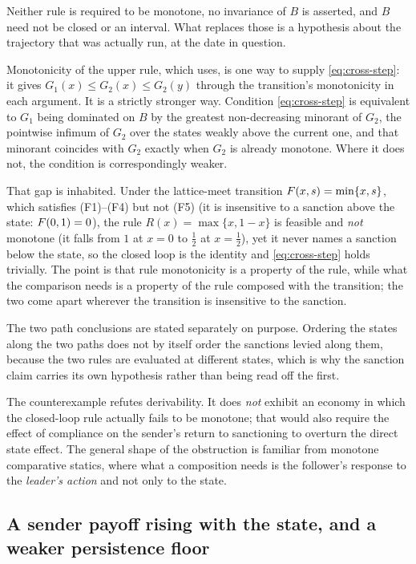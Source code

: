 Neither rule is required to be monotone, no invariance of $B$ is asserted, and $B$
need not be closed or an interval. What replaces those is a hypothesis about the
trajectory that was actually run, at the date in question.

Monotonicity of the upper rule, which  uses, is one
way to supply \eqref{eq:cross-step}: it gives $G_1(x)\le G_2(x)\le G_2(y)$ through
the transition's monotonicity in each argument. It is a strictly stronger way.
Condition \eqref{eq:cross-step} is equivalent to $G_1$ being dominated on $B$ by
the greatest non-decreasing minorant of $G_2$, the pointwise infimum of $G_2$
over the states weakly above the current one, and that minorant coincides with
$G_2$ exactly when $G_2$ is already monotone. Where it does not, the condition is
correspondingly weaker.

That gap is inhabited. Under the lattice-meet transition $F(x,s)=\min\{x,s\}$,
which satisfies \textup{(F1)}--\textup{(F4)} but not \textup{(F5)} (it is
insensitive to a sanction above the state: $F(0,1)=0$), the rule
$R(x)=\max\{x,1-x\}$ is feasible and \emph{not} monotone (it falls from $1$ at
$x=0$ to $\tfrac12$ at $x=\tfrac12$), yet it never names a sanction below the
state, so the closed loop is the identity and \eqref{eq:cross-step} holds
trivially. The point is that rule monotonicity is a property of the rule, while
what the comparison needs is a property of the rule composed with the transition;
the two come apart wherever the transition is insensitive to the sanction.

The two path conclusions are stated separately on purpose. Ordering the states
along the two paths does not by itself order the sanctions levied along them,
because the two rules are evaluated at different states, which is why the
sanction claim carries its own hypothesis rather than being read off the first.

The counterexample refutes derivability. It does \emph{not} exhibit an economy in
which the closed-loop rule actually fails to be monotone; that would
also require the effect of compliance on the sender's return to sanctioning to overturn the direct state effect.
The general shape of the obstruction is familiar from monotone comparative
statics, where what a composition needs is the follower's response to the
\emph{leader's action} and not only to the state.

\subsection{A sender payoff rising with the state, and a weaker persistence floor}
\label{sec:dynamic-stake}

